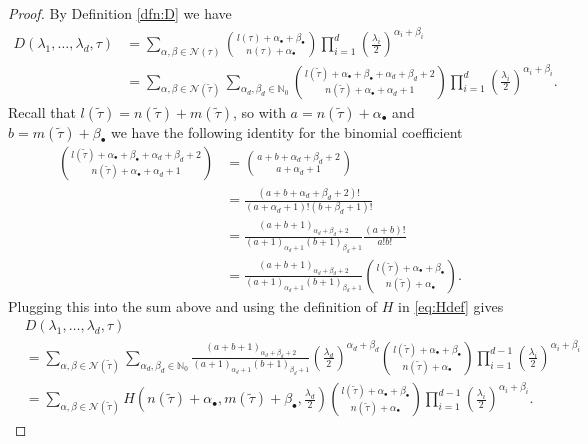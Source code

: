 \documentclass[10pt,a4paper]{amsart}
\begin{document}
\begin{proof} By Definition \ref{dfn:D} we have
\begin{align*}
    D(\lambda_1, \ldots, \lambda_{d}, \tau)  & = 
    \sum_{\alpha, \beta \in \mathcal{N}(\tau)}
    {l(\tau) + \alpha_{\bullet} + \beta_{\bullet} \choose n(\tau) + \alpha_{\bullet}}
    \prod_{i=1}^d \left(\frac{\lambda_i}{2}\right)^{\alpha_i + \beta_i} \\
    & = \sum_{\alpha, \beta \in \mathcal{N}(\tilde{\tau})} \sum_{\alpha_d, \beta_d \in \mathbb{N}_0}
    {l(\tilde{\tau}) + \alpha_{\bullet} + \beta_{\bullet} + \alpha_d + \beta_d + 2
    \choose n(\tilde{\tau}) + \alpha_{\bullet} + \alpha_d + 1}
    \prod_{i=1}^{d} \left(\frac{\lambda_i}{2}\right)^{\alpha_i + \beta_i}. 
\end{align*}
Recall that $l(\tilde{\tau}) = n(\tilde{\tau}) + m(\tilde{\tau})$, so with $a = n(\tilde{\tau}) + \alpha_\bullet$ 
and $b = m(\tilde{\tau}) + \beta_\bullet$ we have the following identity for the 
binomial coefficient 
\begin{align*}
    {l(\tilde{\tau}) + \alpha_{\bullet} + \beta_{\bullet} + \alpha_d + \beta_d + 2
    \choose n(\tilde{\tau}) + \alpha_{\bullet} + \alpha_d + 1} & = 
    {a + b + \alpha_d + \beta_d + 2 \choose a + \alpha_d + 1} \\
    & = \frac{(a + b + \alpha_d + \beta_d + 2)!}{(a + \alpha_d + 1)!(b + \beta_d + 1)!} \\
    & = \frac{(a + b + 1)_{\alpha_d + \beta_d + 2}}{(a + 1)_{\alpha_d + 1}(b + 1)_{\beta_d + 1}}
    \frac{(a + b)!}{a!b!} \\
    & = \frac{(a + b + 1)_{\alpha_d + \beta_d + 2}}{(a + 1)_{\alpha_d + 1}(b + 1)_{\beta_d + 1}}
    {l(\tilde{\tau}) + \alpha_{\bullet} + \beta_{\bullet}
    \choose n(\tilde{\tau}) + \alpha_{\bullet}}.
\end{align*}
Plugging this into the sum above and using the definition of $H$ in \eqref{eq:Hdef} gives
{\small 
\begin{align*}
    & D(\lambda_1, \ldots, \lambda_{d}, \tau)  \\ & = 
    \sum_{\alpha, \beta \in \mathcal{N}(\tilde{\tau})} \sum_{\alpha_d, \beta_d \in \mathbb{N}_0}
    \frac{(a + b + 1)_{\alpha_d + \beta_d + 2}}{(a + 1)_{\alpha_d + 1}(b + 1)_{\beta_d + 1}} \left(\frac{\lambda_d}{2}\right)^{\alpha_d + \beta_d}
    {l(\tilde{\tau}) + \alpha_{\bullet} + \beta_{\bullet}
    \choose n(\tilde{\tau}) + \alpha_{\bullet}} 
    \prod_{i=1}^{d-1} \left(\frac{\lambda_i}{2}\right)^{\alpha_i + \beta_i}
    \\
    & = 
    \sum_{\alpha, \beta \in \mathcal{N}(\tilde{\tau})} 
    H\left(n(\tilde{\tau}) + \alpha_{\bullet}, m(\tilde{\tau}) + \beta_{\bullet}, \frac{\lambda_d}{2}\right) 
    {l(\tilde{\tau}) + \alpha_{\bullet} + \beta_{\bullet}
    \choose n(\tilde{\tau}) + \alpha_{\bullet}}
    \prod_{i=1}^{d-1} \left(\frac{\lambda_i}{2}\right)^{\alpha_i + \beta_i}. 
\end{align*}
}
\end{proof}
\end{document}
